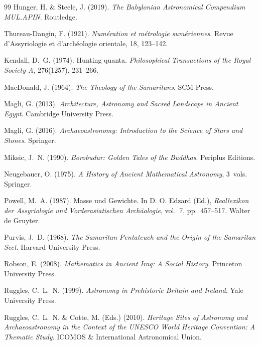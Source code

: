 \begin{thebibliography}{99}
Hunger, H. \& Steele, J. (2019).
\textit{The Babylonian Astronomical Compendium MUL.APIN}.
Routledge.

Thureau-Dangin, F. (1921).
\textit{Numération et métrologie sumériennes}.
Revue d'Assyriologie et d'archéologie orientale, 18, 123--142.

Kendall, D.~G. (1974).
Hunting quanta.
\textit{Philosophical Transactions of the Royal Society A}, 276(1257), 231--266.

MacDonald, J. (1964).
\textit{The Theology of the Samaritans}.
SCM Press.

Magli, G. (2013).
\textit{Architecture, Astronomy and Sacred Landscape in Ancient Egypt}.
Cambridge University Press.

Magli, G. (2016).
\textit{Archaeoastronomy: Introduction to the Science of Stars and Stones}.
Springer.

Miksic, J.~N. (1990).
\textit{Borobudur: Golden Tales of the Buddhas}.
Periplus Editions.

Neugebauer, O. (1975).
\textit{A History of Ancient Mathematical Astronomy}, 3~vols.
Springer.

Powell, M.~A. (1987).
Masse und Gewichte.
In D. O. Edzard (Ed.),
\textit{Reallexikon der Assyriologie und Vorderasiatischen Arch\"aologie},
vol.~7, pp.~457--517. Walter de Gruyter.

Purvis, J.~D. (1968).
\textit{The Samaritan Pentateuch and the Origin of the Samaritan Sect}.
Harvard University Press.

Robson, E. (2008).
\textit{Mathematics in Ancient Iraq: A Social History}.
Princeton University Press.

Ruggles, C.~L.~N. (1999).
\textit{Astronomy in Prehistoric Britain and Ireland}.
Yale University Press.

Ruggles, C.~L.~N. \& Cotte, M. (Eds.) (2010).
\textit{Heritage Sites of Astronomy and Archaeoastronomy in the Context
of the UNESCO World Heritage Convention: A Thematic Study}.
ICOMOS \& International Astronomical Union.


\end{thebibliography}
